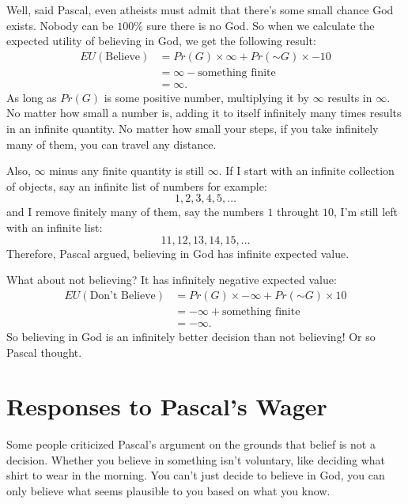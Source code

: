 \documentclass[justified]{tufte-book}
\renewcommand{\neg}{\mathbin{\sim}}
\newcommand{\p}{Pr}
\newcommand{\EU}{EU}
\theoremstyle{definition}
\theoremstyle{definition}
\theoremstyle{definition}
\theoremstyle{definition}
\theoremstyle{remark}
\begin{document}
Well, said Pascal, even atheists must admit that there's some small chance God exists. Nobody can be \(100\%\) sure there is no God. So when we calculate the expected utility of believing in God, we get the following result:
\[
  \begin{aligned}
    \EU(\mbox{Believe}) &= \p(G) \times \infty + \p(\neg G) \times -10\\
                        &= \infty - \mbox{something finite}\\
                        &= \infty.
  \end{aligned}
\]
As long as \(\p(G)\) is some positive number, multiplying it by \(\infty\) results in \(\infty\). No matter how small a number is, adding it to itself infinitely many times results in an infinite quantity. No matter how small your steps, if you take infinitely many of them, you can travel any distance.

Also, \(\infty\) minus any finite quantity is still \(\infty\). If I start with an infinite collection of objects, say an infinite list of numbers for example:
\[ 1, 2, 3, 4, 5, \ldots \]
and I remove finitely many of them, say the numbers \(1\) throught \(10\), I'm still left with an infinite list:
\[ 11, 12, 13, 14, 15, \ldots \]
Therefore, Pascal argued, believing in God has infinite expected value.

What about not believing? It has infinitely negative expected value:
\[
\begin{aligned}
    \EU(\mbox{Don't Believe}) &= \p(G) \times -\infty + \p(\neg G) \times 10\\
                              &= -\infty + \mbox{something finite}\\
                              &= -\infty.
  \end{aligned}
\]
So believing in God is an infinitely better decision than not believing! Or so Pascal thought.

\hypertarget{responses-to-pascals-wager}{%
\section{Responses to Pascal's Wager}\label{responses-to-pascals-wager}}

Some people criticized Pascal's argument on the grounds that belief is not a decision. Whether you believe in something isn't voluntary, like deciding what shirt to wear in the morning. You can't just decide to believe in God, you can only believe what seems plausible to you based on what you know.
\end{document}
